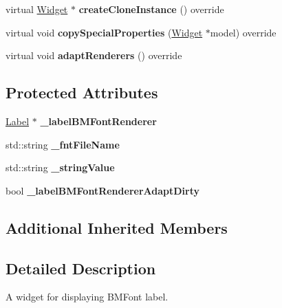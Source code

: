 \begin{DoxyCompactItemize}
\mbox{\label{classui_1_1TextBMFont_a21414ce669af1d79a6e745186fa03f25}} 
virtual \hyperlink{classui_1_1Widget}{Widget} $\ast$ {\bfseries create\+Clone\+Instance} () override
\item 
\mbox{\label{classui_1_1TextBMFont_a52dbaa001f0e65e7e59bc02099715555}} 
virtual void {\bfseries copy\+Special\+Properties} (\hyperlink{classui_1_1Widget}{Widget} $\ast$model) override
\item 
\mbox{\label{classui_1_1TextBMFont_a5de450cd46a9d76dd17ef4ddbbb0833f}} 
virtual void {\bfseries adapt\+Renderers} () override
\end{DoxyCompactItemize}
\subsection*{Protected Attributes}
\begin{DoxyCompactItemize}
\item 
\mbox{\label{classui_1_1TextBMFont_ab87247acf86354cc5eced462e5b3d917}} 
\hyperlink{classLabel}{Label} $\ast$ {\bfseries \+\_\+label\+B\+M\+Font\+Renderer}
\item 
\mbox{\label{classui_1_1TextBMFont_a38b8d34f2a53edfd32139b1a452cf0c5}} 
std\+::string {\bfseries \+\_\+fnt\+File\+Name}
\item 
\mbox{\label{classui_1_1TextBMFont_ac5043a8e397b2f79ba9ae630b2bbe5b5}} 
std\+::string {\bfseries \+\_\+string\+Value}
\item 
\mbox{\label{classui_1_1TextBMFont_a8a28a19bf3510643e94a5e1d6399fb60}} 
bool {\bfseries \+\_\+label\+B\+M\+Font\+Renderer\+Adapt\+Dirty}
\end{DoxyCompactItemize}
\subsection*{Additional Inherited Members}


\subsection{Detailed Description}
A widget for displaying B\+M\+Font label. 

